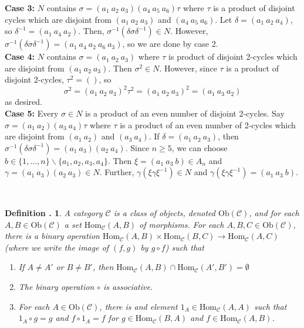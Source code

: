 \documentclass[twoside]{report}
\newcommand{\br}{\centering{ * \quad * \quad *} \\  }
\newcommand{\Ob}{\textrm{Ob}}
\newcommand{\Hom}{\textrm{Hom}}
\newcommand{\fanC}{\mathscr{C}}
\newcounter{Lecture}
\theoremstyle{myts}
\newcounter{c}[Lecture]
\newtheorem{dfn}[c]{Definition \arabic{Lecture}.}
\newcounter{ex}[Lecture]
\newenvironment{prf}{
  \noindent\begin{mdframed}[style=prf]}{\end{mdframed} \vspace{1em}
}
\begin{document}
\begin{prf}
  {\bf Case 3:} $N$ contains \( \sigma = ( a_1 \: a_2 \: a_3 ) ( a_4 \: a_5 \: a_6) \tau \) where $\tau$ is a product of disjoint cycles which are disjoint from \( ( a_1 \: a_2 \: a_3 ) \) and \( ( a_4 \: a_5 \: a_6 ) \). Let \( \delta = ( a_1 \: a_2 \: a_4 ) \), so \( \delta^{-1} = ( a_1 \: a_4 \: a_2 ) \). Then, \(\sigma^{-1} ( \delta\sigma\delta^{-1} ) \in N \). However, \( \sigma^{-1} ( \delta\sigma\delta^{-1} ) = ( a_1 \: a_4 \: a_2 \: a_6 \: a_3 ) \), so we are done by case 2. \\
  {\bf Case 4:} $N$ contains \( \sigma  = ( a_1 \: a_2 \: a_3 ) \) where $\tau$ is product of disjoint 2-cycles which are disjoint from \( ( a_1 \: a_2 \: a_3 ) \). Then \( \sigma^2 \in N \). However, since $\tau$ is a product of disjoint 2-cycles, \( \tau^2 = ( ) \), so
  \[
    \sigma^2 = ( a_1 \: a_2 \: a_3 )^2 \tau^2 = ( a_1 \: a_2 \: a_3 )^2 = ( a_1 \: a_3 \: a_2 )
  \]
  as desired. \\
  {\bf Case 5:} Every \( \sigma \in N \) is a product of an even number of disjoint 2-cycles. Say \( \sigma = ( a_1 \: a_2 ) ( a_3 \: a_4 ) \tau \) where $\tau$ is a product of an even number of 2-cycles which are disjoint from \( ( a_1 \: a_2 ) \) and \( ( a_3 \: a_4 ) \). If \( \delta = ( a_1 \: a_2 \: a_3 ) \), then \( \sigma^{-1} (\delta\sigma\delta^{-1}) = ( a_1 \: a_3 ) ( a_ 2 \: a_4 ) \). Since \( n \geq 5 \), we can choose \( b \in \{ 1,\ldots,n \} \backslash \{ a_1,a_2,a_3,a_4 \} \). Then \( \xi = ( a_1 \: a_3 \: b ) \in A_n \) and \( \gamma = ( a_1 \: a_3 ) ( a_2 \: a_3 ) \in N \). Further, \( \gamma ( \xi\gamma\xi^{-1} ) \in N \) and \( \gamma ( \xi\gamma\xi^{-1} ) = (a_1 \: a_3 \: b ) \).
\end{prf}

\br

\begin{dfn}
  A \emph{category} $\fanC$ is a class of objects, denoted \( \Ob(\fanC) \), and for each \( A,B \in \Ob(\fanC) \) a set \( \Hom_\fanC (A,B) \) of morphisms. For each \( A,B,C \in \Ob(\fanC) \), there is a binary operation \( \Hom_\fanC (A,B) \times \Hom_\fanC (B,C ) \to \Hom_\fanC (A,C) \) (where we write the image of \( (f,g) \) by \( g \circ f \)) such that
  \begin{enumerate}[(1)]
    \item If \(A\neq A' \) or \( B \neq B' \), then \( \Hom_\fanC (A,B) \cap \Hom_\fanC (A',B') = \emptyset \)
    \item The binary operation \( \circ \) is associative.
    \item For each \( A\in\Ob(\fanC) \), there is and element \( 1_A \in \Hom_\fanC (A,A) \) such that \( 1_A \circ g = g \) and \( f \circ 1_A = f \) for \( g\in \Hom_\fanC (B,A) \) and \( f \in \Hom_\fanC ( A, B ) \).
  \end{enumerate}
\end{dfn}
\end{document}
